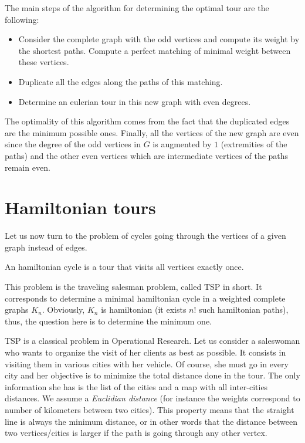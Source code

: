 The main steps of the algorithm for determining the optimal tour are the following:

\begin{itemize}
\item Consider the complete graph with the odd vertices and compute its weight by the shortest paths.
Compute a perfect matching of minimal weight between these vertices. 
\item Duplicate all the edges along the paths of this matching.
\item Determine an eulerian tour in this new graph with even degrees.
\end{itemize}

The optimality of this algorithm comes from the fact that the duplicated edges are the minimum possible ones.
Finally, all the vertices of the new graph are even since the degree of the odd vertices in $G$ is augmented by $1$
(extremities of the paths) and the other even vertices which are intermediate vertices of the paths remain even. 



\section{Hamiltonian tours}

Let us now turn to the problem of cycles going through the vertices of a given graph instead of edges.
\bigskip

An hamiltonian cycle is a tour that visits all vertices exactly once.

This problem is the traveling salesman problem, called TSP in short.
It corresponds to determine a minimal hamiltonian cycle in a weighted complete graphs $K_n$.
Obviously, $K_n$ is hamiltonian (it exists $n!$ such hamiltonian paths), thus, the question here is to determine the minimum one. 

TSP is a classical problem in Operational Research.
Let us consider a saleswoman who wants to organize the visit of her clients as best as possible.
It consists in visiting them in various cities with her vehicle. 
Of course, she must go in every city and her objective is to minimize the total distance done in the tour. 
The only information she has is the list of the cities and a map with all inter-cities distances. 
We assume a \textit{Euclidian distance} (for instance the weights correspond to number of kilometers between two cities).
This property means that the straight line is always the minimum distance, or in other words that the distance between two vertices/cities
is larger if the path is going through any other vertex. 
\bigskip

